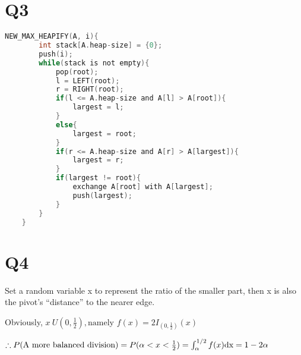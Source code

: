 \documentclass{article}
\begin{document}
\begin{sloppypar}
\section*{Q3}
\begin{lstlisting}[language=C]
    NEW_MAX_HEAPIFY(A, i){
        int stack[A.heap-size] = {0};
        push(i);
        while(stack is not empty){
            pop(root);
            l = LEFT(root);
            r = RIGHT(root);
            if(l <= A.heap-size and A[l] > A[root]){
                largest = l;
            }
            else{
                largest = root;
            }
            if(r <= A.heap-size and A[r] > A[largest]){
                largest = r;
            }
            if(largest != root){
                exchange A[root] with A[largest];
                push(largest);
            }
        }
    }
\end{lstlisting}

\section*{Q4}
Set a random variable x to represent the ratio of the smaller part, then x is also the pivot's ``distance'' to the nearer edge.

Obviously, $x ~ U(0, \frac{1}{2}), \text{namely }f(x) = 2I_{(0, \frac{1}{2})}(x)$

$\therefore P(\text{A more balanced division}) = P(\alpha < x < \frac{1}{2}) = \int_{\alpha}^{1/2}f(x)\rm dx = 1 - 2\alpha$


\end{sloppypar}
\end{document}
